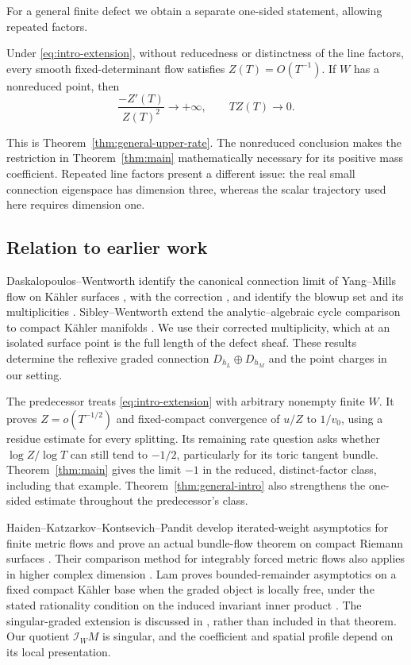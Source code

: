 For a general finite defect we obtain a separate
one-sided statement, allowing repeated factors.

\begin{theorem}\label{thm:general-intro}
Under \eqref{eq:intro-extension}, without reducedness
or distinctness of the line factors, every smooth
fixed-determinant flow satisfies \(Z(T)=O(T^{-1})\).
If \(W\) has a nonreduced point, then
\[
 \frac{-Z'(T)}{Z(T)^2}\longrightarrow+\infty,
 \qquad TZ(T)\longrightarrow0.
\]
\end{theorem}

This is Theorem~\ref{thm:general-upper-rate}.
The nonreduced conclusion makes the restriction
in Theorem~\ref{thm:main} mathematically necessary
for its positive mass coefficient. Repeated line
factors present a different issue: the real small
connection eigenspace has dimension three, whereas
the scalar trajectory used here requires dimension one.

\subsection{Relation to earlier work}

Daskalopoulos--Wentworth identify the canonical
connection limit of Yang--Mills flow on Kähler
surfaces \cite{DaskalopoulosWentworth04}, with the
correction \cite{DaskalopoulosWentworth07c}, and identify
the blowup set and its multiplicities
\cite{DaskalopoulosWentworth07b}.
Sibley--Wentworth extend the analytic--algebraic
cycle comparison to compact Kähler manifolds
\cite{SibleyWentworth15}. We use their corrected
multiplicity, which at an isolated surface point
is the full length of the defect sheaf.
These results determine the reflexive graded
connection \(D_{h_L}\oplus D_{h_M}\) and the
point charges in our setting.

The predecessor \cite{W_Singular} treats
\eqref{eq:intro-extension} with arbitrary nonempty
finite \(W\). It proves
\(Z=o(T^{-1/2})\) and fixed-compact convergence
of \(u/Z\) to \(1/v_0\), using a residue estimate
for every splitting. Its remaining rate question
asks whether \(\log Z/\log T\) can still tend
to \(-1/2\), particularly for its toric tangent
bundle. Theorem~\ref{thm:main} gives the limit
\(-1\) in the reduced, distinct-factor class,
including that example. Theorem~\ref{thm:general-intro}
also strengthens the one-sided estimate throughout
the predecessor's class.

Haiden--Katzarkov--Kontsevich--Pandit develop
iterated-weight asymptotics for finite metric
flows \cite{HKKP23} and prove an actual bundle-flow
theorem on compact Riemann surfaces
\cite[Theorem~1.1]{HKKP18}. Their comparison method
for integrably forced metric flows also applies
in higher complex dimension
\cite[Section~4.2]{HKKP18}.
Lam proves bounded-remainder asymptotics on a
fixed compact Kähler base when the graded object
is locally free, under the stated rationality
condition on the induced invariant inner product
\cite[Theorem~1.1, Theorem~8.2]{Lam26}.
The singular-graded extension is discussed in
\cite[Remark~8.3]{Lam26}, rather than included in
that theorem. Our quotient \(\mathcal I_WM\)
is singular, and the coefficient and spatial
profile depend on its local presentation.

